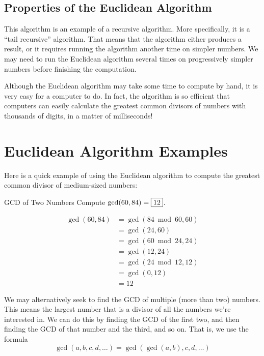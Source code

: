 \documentclass[a4paper,10pt]{report}
\begin{document}
\subsection{Properties of the Euclidean Algorithm}

This algorithm is an example of a recursive algorithm. More specifically, it is
a ``tail recursive'' algorithm. That means that the algorithm either produces a
result, or it requires running the algorithm another time on simpler numbers. We
may need to run the Euclidean algorithm several times on progressively simpler
numbers before finishing the computation.

Although the Euclidean algorithm may take some time to compute by hand, it is
very easy for a computer to do. In fact, the algorithm is so efficient that
computers can easily calculate the greatest common divisors of numbers with
thousands of digits, in a matter of milliseconds!

\section{Euclidean Algorithm Examples}

Here is a quick example of using the Euclidean algorithm to compute the
greatest common divisor of medium-sized numbers:

\begin{problem}{GCD of Two Numbers}
 Compute $\gcd(60, 84) = \Ans{12}$.

 \begin{solution}
  \begin{align*}
   \gcd(60, 84)
   &= \gcd(84 \bmod 60, 60) \\
   &= \gcd(24, 60) \\
   &= \gcd(60 \bmod 24, 24) \\
   &= \gcd(12, 24) \\
   &= \gcd(24 \bmod 12, 12) \\
   &= \gcd(0, 12) \\
   &= 12
  \end{align*}
 \end{solution}
\end{problem}

We may alternatively seek to find the GCD of multiple (more than two) numbers.
This means the largest number that is a divisor of all the numbers we're
interested in. We can do this by finding the GCD of the first two, and then
finding the GCD of that number and the third, and so on. That is, we use the
formula \[
 \gcd(a, b, c, d, \dots) = \gcd(\gcd(a, b), c, d, \dots)
\]
\end{document}

